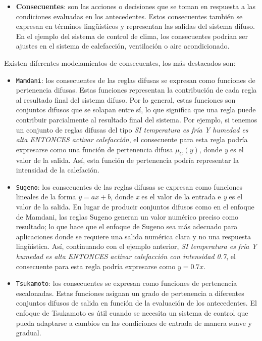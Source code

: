 \documentclass[
  a4paper,
  DIV=11,
  numbers=noendperiod]{scrreprt}
\providecommand{\tightlist}{%
  \setlength{\itemsep}{0pt}\setlength{\parskip}{0pt}}\usepackage{longtable,booktabs,array}
\begin{document}
\begin{itemize}
\tightlist
\item
  \textbf{Consecuentes}: son las acciones o decisiones que se toman en
  respuesta a las condiciones evaluadas en los antecedentes. Estos
  consecuentes también se expresan en términos lingüísticos y
  representan las salidas del sistema difuso. En el ejemplo del sistema
  de control de clima, los consecuentes podrían ser ajustes en el
  sistema de calefacción, ventilación o aire acondicionado.
\end{itemize}

Existen diferentes modelamientos de consecuentes, los más destacados
son:

\begin{itemize}
\item
  \texttt{Mamdani}: los consecuentes de las reglas difusas se expresan
  como funciones de pertenencia difusas. Estas funciones representan la
  contribución de cada regla al resultado final del sistema difuso. Por
  lo general, estas funciones son conjuntos difusos que se solapan entre
  sí, lo que significa que una regla puede contribuir parcialmente al
  resultado final del sistema. Por ejemplo, si tenemos un conjunto de
  reglas difusas del tipo \emph{SI temperatura es fría Y humedad es alta
  ENTONCES activar calefacción}, el consecuente para esta regla podría
  expresarse como una función de pertenencia difusa \(\mu_C(y)\), donde
  \emph{y} es el valor de la salida. Así, esta función de pertenencia
  podría representar la intensidad de la calefación.
\item
  \texttt{Sugeno}: los consecuentes de las reglas difusas se expresan
  como funciones lineales de la forma \(y = ax + b\), donde \emph{x} es
  el valor de la entrada e \emph{y} es el valor de la salida. En lugar
  de producir conjuntos difusos como en el enfoque de Mamdani, las
  reglas Sugeno generan un valor numérico preciso como resultado; lo que
  hace que el enfoque de Sugeno sea más adecuado para aplicaciones donde
  se requiere una salida numérica clara y no una respuesta lingüística.
  Así, continuando con el ejemplo anterior, \emph{SI temperatura es fría
  Y humedad es alta ENTONCES activar calefacción con intensidad 0.7}, el
  consecuente para esta regla podría expresarse como \(y=0.7x\).
\item
  \texttt{Tsukamoto}: los consecuentes se expresan como funciones de
  pertenencia escalonadas. Estas funciones asignan un grado de
  pertenencia a diferentes conjuntos difusos de salida en función de la
  evaluación de los antecedentes. El enfoque de Tsukamoto es útil cuando
  se necesita un sistema de control que pueda adaptarse a cambios en las
  condiciones de entrada de manera suave y gradual.
\end{itemize}
\end{document}
